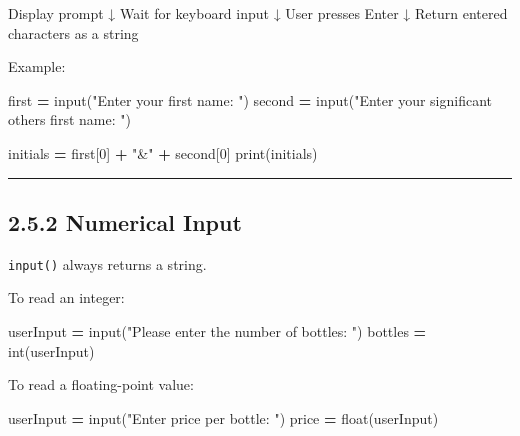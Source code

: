 \documentclass[
]{article}
\newenvironment{Shaded}{\begin{snugshade}}{\end{snugshade}}
\newcommand{\BuiltInTok}[1]{#1}
\newcommand{\DecValTok}[1]{\textcolor[rgb]{0.00,0.00,0.81}{#1}}
\newcommand{\NormalTok}[1]{#1}
\newcommand{\OperatorTok}[1]{\textcolor[rgb]{0.81,0.36,0.00}{\textbf{#1}}}
\newcommand{\StringTok}[1]{\textcolor[rgb]{0.31,0.60,0.02}{#1}}
\begin{document}
\begin{Shaded}
\begin{Highlighting}[]
\NormalTok{Display prompt}
\NormalTok{     ↓}
\NormalTok{Wait for keyboard input}
\NormalTok{     ↓}
\NormalTok{User presses Enter}
\NormalTok{     ↓}
\NormalTok{Return entered characters as a string}
\end{Highlighting}
\end{Shaded}

Example:

\begin{Shaded}
\begin{Highlighting}[]
\NormalTok{first }\OperatorTok{=} \BuiltInTok{input}\NormalTok{(}\StringTok{"Enter your first name: "}\NormalTok{)}
\NormalTok{second }\OperatorTok{=} \BuiltInTok{input}\NormalTok{(}\StringTok{"Enter your significant other\textquotesingle{}s first name: "}\NormalTok{)}

\NormalTok{initials }\OperatorTok{=}\NormalTok{ first[}\DecValTok{0}\NormalTok{] }\OperatorTok{+} \StringTok{"\&"} \OperatorTok{+}\NormalTok{ second[}\DecValTok{0}\NormalTok{]}
\BuiltInTok{print}\NormalTok{(initials)}
\end{Highlighting}
\end{Shaded}

\begin{center}\rule{0.5\linewidth}{0.5pt}\end{center}

\subsection{2.5.2 Numerical Input}\label{numerical-input}

\texttt{input()} always returns a string.

To read an integer:

\begin{Shaded}
\begin{Highlighting}[]
\NormalTok{userInput }\OperatorTok{=} \BuiltInTok{input}\NormalTok{(}\StringTok{"Please enter the number of bottles: "}\NormalTok{)}
\NormalTok{bottles }\OperatorTok{=} \BuiltInTok{int}\NormalTok{(userInput)}
\end{Highlighting}
\end{Shaded}

To read a floating-point value:

\begin{Shaded}
\begin{Highlighting}[]
\NormalTok{userInput }\OperatorTok{=} \BuiltInTok{input}\NormalTok{(}\StringTok{"Enter price per bottle: "}\NormalTok{)}
\NormalTok{price }\OperatorTok{=} \BuiltInTok{float}\NormalTok{(userInput)}
\end{Highlighting}
\end{Shaded}
\end{document}
